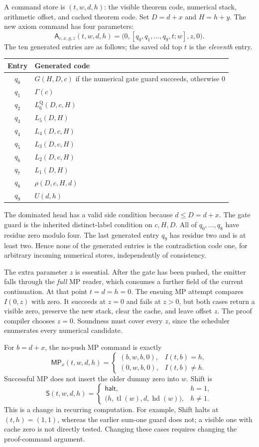 A command store is $(t,w,d,h)$: the visible theorem code, numerical stack,
arithmetic offset, and cached theorem code. Set $D=d+x$ and $H=h+y$.
The new axiom command has four parameters:
\[
 \mathsf A_{c,x,y,z}(t,w,d,h)
       =\bigl(0,[q_0,q_1,\ldots,q_9,t;w],z,0\bigr).
 \tag{A}
\]
The ten generated entries are as follows; the saved old top $t$ is the
\emph{eleventh} entry.
\begin{center}
\begin{tabular}{cl}
\toprule
Entry & Generated code\\
\midrule
$q_0$ & $G(H,D,c)$ if the numerical gate guard succeeds, otherwise $0$\\
$q_1$ & $\Gamma(c)$\\
$q_2$ & $L_6^{\mathrm Q}(D,c,H)$\\
$q_3$ & $L_5(D,H)$\\
$q_4$ & $L_4(D,c,H)$\\
$q_5$ & $L_3(D,c,H)$\\
$q_6$ & $L_2(D,c,H)$\\
$q_7$ & $L_1(D,H)$\\
$q_8$ & $\rho(D,c,H,d)$\\
$q_9$ & $U(d,h)$\\
\bottomrule
\end{tabular}
\end{center}
The dominated head has a valid side condition because $d\leq D=d+x$.
The gate guard is the inherited distinct-label condition on $c,H,D$.
All of $q_0,\ldots,q_8$ have residue zero modulo four. The last generated
entry $q_9$ has residue two and is at least two. Hence none of the generated
entries is the contradiction code one, for arbitrary incoming numerical
stores, independently of consistency.

The extra parameter $z$ is essential. After the gate has been pushed,
the emitter falls through the \emph{full} MP reader, which consumes a
further field of the current continuation. At that point $t=d=h=0$.
The ensuing MP attempt compares $I(0,z)$ with zero. It succeeds at $z=0$
and fails at $z>0$, but both cases return a visible zero, preserve the
new stack, clear the cache, and leave offset $z$. The proof compiler
chooses $z=0$. Soundness must cover every $z$, since the scheduler
enumerates every numerical candidate.

For $b=d+x$, the no-push MP command is exactly
\[
 \mathsf{MP}_x(t,w,d,h)=
 \begin{cases}
   (b,w,b,0),& I(t,b)=h,\\
   (0,w,b,0),& I(t,b)\ne h.
 \end{cases}
 \tag{MP}
\]
Successful MP does not insert the older dummy zero into $w$. Shift is
\[
 \mathsf S(t,w,d,h)=
 \begin{cases}
   \mathsf{halt},&h=1,\\
   \bigl(h,\operatorname{tl}(w),d,\operatorname{hd}(w)\bigr),&h\ne1.
 \end{cases}
 \tag{S}
\]
This is a change in recurring computation. For example, Shift halts at
$(t,h)=(1,1)$, whereas the earlier sum-one guard does not; a visible one
with cache zero is not directly tested. Changing these cases requires
changing the proof-command argument.

